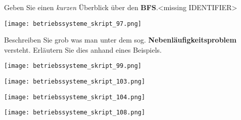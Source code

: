 \documentclass{article}
\begin{document}
\begin{tcolorbox}[colback=white!10!white,colframe=lightgray!75!black,
  savelowerto=\jobname_ex.tex,breakable,enhanced,lines before break=40]

\justifying
Geben Sie einen \textit{kurzen} Überblick über den \textbf{BFS}.<missing IDENTIFIER>

\tcblower

\justifying
\begin{center}
\texttt{[image: betriebssysteme\_skript\_97.png]}
\end{center}

\end{tcolorbox}
\begin{tcolorbox}[colback=white!10!white,colframe=lightgray!75!black,
  savelowerto=\jobname_ex.tex,breakable,enhanced,lines before break=40]

\justifying
Beschreiben Sie grob was man unter dem sog. \textbf{Nebenläufigkeitsproblem} versteht. Erläutern Sie dies anhand eines Beispiels.

\tcblower

\justifying
\begin{center}
\texttt{[image: betriebssysteme\_skript\_99.png]}
\end{center}
\begin{center}
\texttt{[image: betriebssysteme\_skript\_103.png]}
\end{center}
\begin{center}
\texttt{[image: betriebssysteme\_skript\_104.png]}
\end{center}
\begin{center}
\texttt{[image: betriebssysteme\_skript\_108.png]}
\end{center}

\end{tcolorbox}
\end{document}
